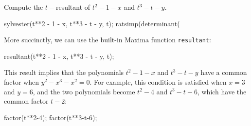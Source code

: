 \example Compute the $t-$resultant of $t^2 - 1 -x$ and $t^3-t-y$.

\begin{maximablock}

sylvester(t**2 - 1 - x, t**3 - t - y, t);
ratsimp(determinant(%
\end{maximablock}

More succinctly, we can use the built-in Maxima function {\tt resultant}:

\begin{maximablock}
resultant(t**2 - 1 - x, t**3 - t - y, t);
\end{maximablock}

This result implies that the polynomials $t^2-1-x$ and $t^3-t-y$
have a common factor when $y^2-x^3-x^2=0$.  For example,
this condition is satisfied when $x=3$ and $y=6$, and
the two polynomials become $t^2-4$ and $t^3-t-6$, which
have the common factor $t-2$:

\begin{maximablock}
factor(t**2-4);
factor(t**3-t-6);
\end{maximablock}

\endexample


\vfill\eject

